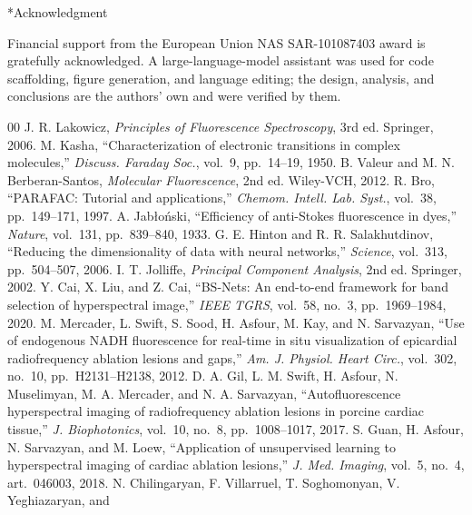 \documentclass{article}
\makeatletter
\renewcommand\section{\@startsection{section}{1}{\z@}{9pt}{4pt}{\normalfont\bfseries}}
\makeatother
\begin{document}
\section*{Acknowledgment}
{\setlength{\emergencystretch}{2em}Financial support from the European Union NAS SAR-101087403 award is gratefully acknowledged. A large-language-model assistant was
used for code scaffolding, figure generation, and language editing; the design,
analysis, and conclusions are the authors' own and were verified by them.\par}

\begin{thebibliography}{00}
 J. R. Lakowicz, \emph{Principles of Fluorescence Spectroscopy},
3rd ed. Springer, 2006.
 M. Kasha, ``Characterization of electronic transitions in complex
molecules,'' \emph{Discuss. Faraday Soc.}, vol.~9, pp.~14--19, 1950.
 B. Valeur and M. N. Berberan-Santos, \emph{Molecular Fluorescence},
2nd ed. Wiley-VCH, 2012.
 R. Bro, ``PARAFAC: Tutorial and applications,'' \emph{Chemom. Intell. Lab. Syst.}, vol.~38, pp.~149--171, 1997.
 A. Jab\l{}o\'nski, ``Efficiency of anti-Stokes fluorescence in
dyes,'' \emph{Nature}, vol.~131, pp.~839--840, 1933.
 G. E. Hinton and R. R. Salakhutdinov, ``Reducing the dimensionality
of data with neural networks,'' \emph{Science}, vol.~313, pp.~504--507, 2006.
 I. T. Jolliffe, \emph{Principal Component Analysis}, 2nd ed.
Springer, 2002.
 Y. Cai, X. Liu, and Z. Cai, ``BS-Nets: An end-to-end framework for
band selection of hyperspectral image,'' \emph{IEEE TGRS},
vol.~58, no.~3, pp.~1969--1984, 2020.
 M. Mercader, L. Swift, S. Sood, H. Asfour, M. Kay, and
N. Sarvazyan, ``Use of endogenous NADH fluorescence for real-time in situ visualization
of epicardial radiofrequency ablation lesions and gaps,'' \emph{Am. J. Physiol. Heart Circ.}, vol.~302, no.~10, pp.~H2131--H2138, 2012.
 D. A. Gil, L. M. Swift, H. Asfour, N. Muselimyan, M. A. Mercader, and
N. A. Sarvazyan, ``Autofluorescence hyperspectral imaging of radiofrequency ablation
lesions in porcine cardiac tissue,'' \emph{J. Biophotonics}, vol.~10, no.~8,
pp.~1008--1017, 2017.
 S. Guan, H. Asfour, N. Sarvazyan, and M. Loew, ``Application of
unsupervised learning to hyperspectral imaging of cardiac ablation lesions,'' \emph{J.
Med. Imaging}, vol.~5, no.~4, art.~046003, 2018.
 N. Chilingaryan, F. Villarruel, T. Soghomonyan, V. Yeghiazaryan, and

\end{thebibliography}
\end{document}
